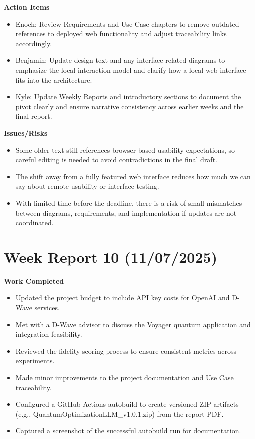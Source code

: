 \textbf{Action Items}
\begin{itemize}
  \item Enoch: Review Requirements and Use Case chapters to remove outdated references to deployed web functionality and adjust traceability links accordingly.
  \item Benjamin: Update design text and any interface-related diagrams to emphasize the local interaction model and clarify how a local web interface fits into the architecture.
  \item Kyle: Update Weekly Reports and introductory sections to document the pivot clearly and ensure narrative consistency across earlier weeks and the final report.
\end{itemize}

\textbf{Issues/Risks}
\begin{itemize}
  \item Some older text still references browser-based usability expectations, so careful editing is needed to avoid contradictions in the final draft.
  \item The shift away from a fully featured web interface reduces how much we can say about remote usability or interface testing.
  \item With limited time before the deadline, there is a risk of small mismatches between diagrams, requirements, and implementation if updates are not coordinated.
\end{itemize}

\section{Week Report 10 (11/07/2025)}
\label{sec::W10}

\textbf{Work Completed}
\begin{itemize}
    \item Updated the project budget to include API key costs for OpenAI and D-Wave services.
    \item Met with a D-Wave advisor to discuss the Voyager quantum application and integration feasibility.
    \item Reviewed the fidelity scoring process to ensure consistent metrics across experiments.
    \item Made minor improvements to the project documentation and Use Case traceability.
    \item Configured a GitHub Actions autobuild to create versioned ZIP artifacts (e.g., QuantumOptimizationLLM\_v1.0.1.zip) from the report PDF.
    \item Captured a screenshot of the successful autobuild run for documentation.
\end{itemize}

